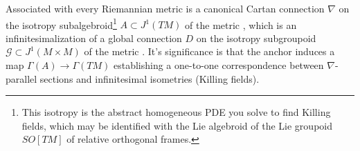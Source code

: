 \documentclass[leqno,12pt]{amsart} %
\begin{document}
\begin{example}
  Associated with every Riemannian metric is a canonical Cartan connection $\nabla $ on
  the isotropy subalgebroid\footnote{This isotropy is the abstract homogeneous PDE you
    solve to find Killing fields, which may be identified with the Lie algebroid of the
    Lie groupoid $SO[TM]$ of relative orthogonal frames.} $A \subset J^1 (TM)$ of the
  metric \cite{Blaom_06,Blaom_12}, which is an infinitesimalization of a global connection
  $D$ on the isotropy subgroupoid ${\mathcal G} \subset J^1(M \times M)$ of the metric
  \cite{Blaom_16b}. It's significance is that the anchor induces a map
  $\Gamma(A) \rightarrow \Gamma(TM)$ establishing a one-to-one correspondence between
  $\nabla $-parallel sections and infinitesimal isometries (Killing fields).


\end{example}
\end{document}
